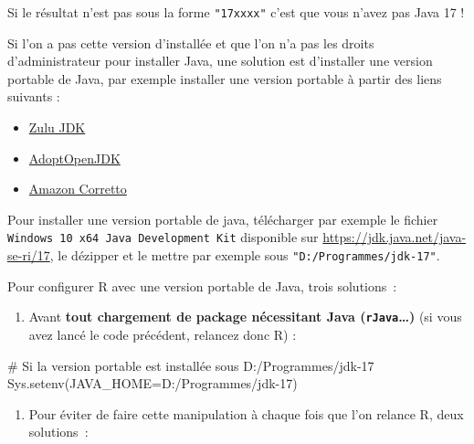 \documentclass[
  a4paper,
  DIV=11,
  numbers=noendperiod,
  french]{scrartcl}
\newcommand{\VERB}{\Verb[commandchars=\\\{\}]}
\newenvironment{Shaded}{\begin{snugshade}}{\end{snugshade}}
\newcommand{\AttributeTok}[1]{\textcolor[rgb]{0.40,0.45,0.13}{#1}}
\newcommand{\CommentTok}[1]{\textcolor[rgb]{0.37,0.37,0.37}{#1}}
\newcommand{\FunctionTok}[1]{\textcolor[rgb]{0.28,0.35,0.67}{#1}}
\newcommand{\NormalTok}[1]{\textcolor[rgb]{0.00,0.23,0.31}{#1}}
\newcommand{\StringTok}[1]{\textcolor[rgb]{0.13,0.47,0.30}{#1}}
\providecommand{\tightlist}{%
  \setlength{\itemsep}{0pt}\setlength{\parskip}{0pt}}\usepackage{longtable,booktabs,array}
\newcommand\1{{\mathds 1}}
\theoremstyle{remark}
\begin{document}
Si le résultat n'est pas sous la forme \texttt{"17xxxx"} c'est que vous
n'avez pas Java 17 !

Si l'on a pas cette version d'installée et que l'on n'a pas les droits
d'administrateur pour installer Java, une solution est d'installer une
version portable de Java, par exemple installer une version portable à
partir des liens suivants :

\begin{itemize}
\item
  \href{https://www.azul.com/downloads/\#zulu}{Zulu JDK}
\item
  \href{https://adoptopenjdk.net/}{AdoptOpenJDK}
\item
  \href{https://aws.amazon.com/corretto/}{Amazon Corretto}
\end{itemize}

Pour installer une version portable de java, télécharger par exemple le
fichier \texttt{Windows\ 10\ x64\ Java\ Development\ Kit} disponible sur
\url{https://jdk.java.net/java-se-ri/17}, le dézipper et le mettre par
exemple sous \texttt{"D:/Programmes/jdk-17"}.

Pour configurer R avec une version portable de Java, trois solutions~:

\begin{enumerate}
\def\labelenumi{\arabic{enumi}.}
\tightlist
\item
  Avant \textbf{tout chargement de package nécessitant Java
  (\texttt{rJava}\ldots)} (si vous avez lancé le code précédent,
  relancez donc R) :
\end{enumerate}

\begin{Shaded}
\begin{Highlighting}[]
\CommentTok{\# Si la version portable est installée sous D:/Programmes/jdk{-}17}
\FunctionTok{Sys.setenv}\NormalTok{(}\AttributeTok{JAVA\_HOME=}\StringTok{\textquotesingle{}D:/Programmes/jdk{-}17\textquotesingle{}}\NormalTok{)}
\end{Highlighting}
\end{Shaded}

\begin{enumerate}
\def\labelenumi{\arabic{enumi}.}
\setcounter{enumi}{1}
\tightlist
\item
  Pour éviter de faire cette manipulation à chaque fois que l'on relance
  R, deux solutions~:
\end{enumerate}

\end{document}
